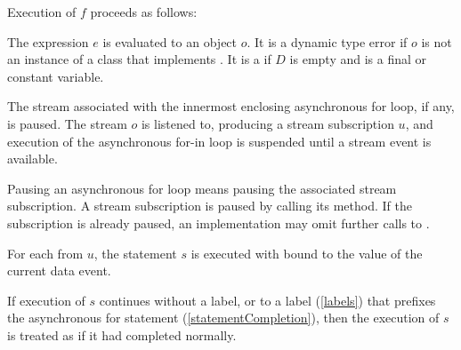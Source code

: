 \documentclass[makeidx]{article}
\begin{document}
{

\LMHash{}%
Execution of $f$ proceeds as follows:

\LMHash{}%
The expression $e$ is evaluated to an object $o$.
It is a dynamic type error if $o$ is not an instance of
a class that implements .
It is a  if $D$ is empty
and \id{} is a final or constant variable.

\LMHash{}%
The stream associated with the innermost enclosing asynchronous for loop,
if any, is paused.
The stream $o$ is listened to, producing a stream subscription $u$,
and execution of the asynchronous for-in loop is suspended
until a stream event is available.

Pausing an asynchronous for loop means pausing
the associated stream subscription.
A stream subscription is paused by calling its  method.
If the subscription is already paused, an implementation may omit
further calls to .


\LMHash{}%
For each  from $u$,
the statement $s$ is executed with \id{} bound to
the value of the current data event.


\LMHash{}%
If execution of $s$ continues without a label,
or to a label (\ref{labels})
that prefixes the asynchronous for statement (\ref{statementCompletion}),
then the execution of $s$ is treated as if it had completed normally.

}
\end{document}
